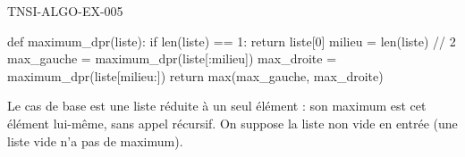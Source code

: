 \begin{corrige}{TNSI-ALGO-EX-005}
\begin{python}
def maximum_dpr(liste):
    if len(liste) == 1:
        return liste[0]
    milieu = len(liste) // 2
    max_gauche = maximum_dpr(liste[:milieu])
    max_droite = maximum_dpr(liste[milieu:])
    return max(max_gauche, max_droite)
\end{python}
Le cas de base est une liste réduite à un seul élément : son maximum est cet élément lui-même, sans appel récursif. On suppose la liste non vide en entrée (une liste vide n'a pas de maximum).
\end{corrige}
